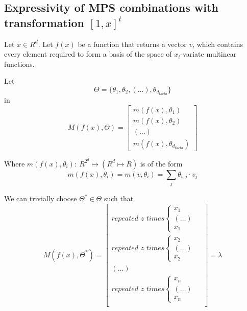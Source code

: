 \documentclass[11pt]{article}
\begin{document}
\subsection{Expressivity of MPS combinations with transformation $[1,x]^t$}
Let $x \in R^d$.
Let $f(x)$ be a function that returns a vector $v$, which contains every
element required to form a basis of the space of $x_i$-variate multinear functions.

Let 
\begin{equation}
    \Theta = \{ \theta_1, \theta_2, (\dots), \theta_{d_{theta}} \}
\end{equation}
in
\begin{equation}
    M(f(x), \Theta)
    = 
    \begin{bmatrix}
        m(f(x), \theta_1) \\
        m(f(x), \theta_2) \\
        (\dots) \\
        m(f(x), \theta_{d_{theta}}) 
    \end{bmatrix}
\end{equation}

Where $m(f(x), \theta_i): \ R^{2^d} \mapsto (R^d \mapsto R)$ is of the form
\begin{equation}
    m(f(x), \theta_i)
    = 
    m(v, \theta_i)
    =
    \sum_j \theta_{i,j} \cdot v_j
\end{equation}

We can trivially choose $\Theta^* \in \Theta$ such that 
\begin{equation}
    M(f(x), \Theta^*)
    = 
    \begin{bmatrix}
        \textit{repeated $z$ times} 
        \begin{cases}
            x_1 &  \\
            (\dots) & \\
            x_1 & 
        \end{cases} \\
        \textit{repeated $z$ times} 

        \begin{cases}
            x_2 &  \\
            (\dots) & \\
            x_2 & 
        \end{cases} \\
        (\dots) \\
        \textit{repeated $z$ times} 
        \begin{cases}
            x_n &  \\
            (\dots) & \\
            x_n & 
        \end{cases} \\
    \end{bmatrix}
    = \lambda
\end{equation}
\end{document}
